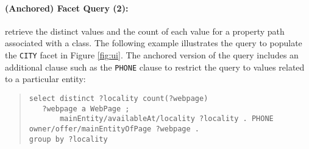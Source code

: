 \paragraph{(Anchored) Facet Query (2):} retrieve the distinct values and the count of each value for a property path associated with a class.
The following example illustrates the query to populate the \verb|CITY| facet in Figure \ref{fig:ui}.
The anchored version of the query includes an additional clause such as the \verb|PHONE| clause to restrict the query to values related to a particular entity:
\begin{quote}
{\footnotesize
\begin{verbatim}
select distinct ?locality count(?webpage)
   ?webpage a WebPage ;
       mainEntity/availableAt/locality ?locality . PHONE owner/offer/mainEntityOfPage ?webpage .
group by ?locality
\end{verbatim}}
\end{quote}

